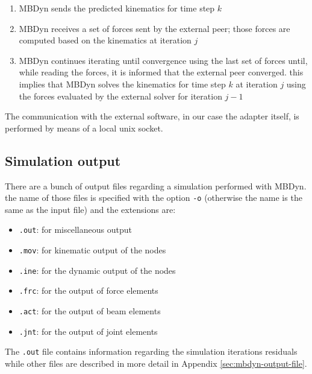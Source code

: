 \begin{enumerate}
	\item MBDyn sends the predicted kinematics for time step $k$
	\item MBDyn receives a set of forces sent by the external peer; those forces are computed based on the kinematics at iteration $j$
	\item MBDyn continues iterating until convergence using the last set of forces until, while reading the forces, it is informed that the external peer converged. this implies that MBDyn solves the kinematics for time step $k$ at iteration $j$ using the forces evaluated by the external solver for iteration $j-1$ 
\end{enumerate}

The communication with the external software, in our case the adapter itself, is performed by means of a local unix socket.


\subsection{Simulation output}
\label{sec:mbd-output}

There are a bunch of output files regarding a simulation performed with MBDyn. the name of those files is specified with the option \texttt{-o} (otherwise the name is the same as the input file) and the extensions are:

\begin{itemize}
    \item \texttt{.out}: for miscellaneous output
    \item \texttt{.mov}: for kinematic output of the nodes
    \item \texttt{.ine}: for the dynamic output of the nodes
    \item \texttt{.frc}: for the output of force elements
    \item \texttt{.act}: for the output of beam elements
    \item \texttt{.jnt}: for the output of joint elements
\end{itemize}

The \texttt{.out} file contains information regarding the simulation iterations residuals while other files are described in more detail in Appendix \ref{sec:mbdyn-output-file}.



